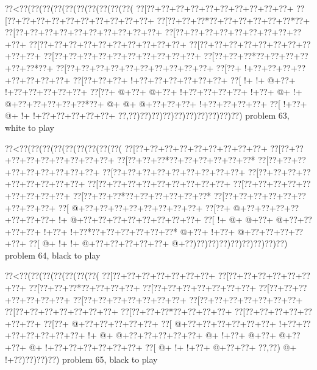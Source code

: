 \vbox{\vbox{\goo
\0??<\0??(\0??(\0??(\0??(\0??(\0??(\0??(\0??(\0??(\0??(
\0??[\0??+\0??+\0??+\0??+\0??+\0??+\0??+\0??+\0??+\0??+
\0??[\0??+\0??+\0??+\0??+\0??+\0??+\0??+\0??+\0??+\0??+
\0??[\0??+\0??+\0??*\0??+\0??+\0??+\0??+\0??+\0??*\0??+
\0??[\0??+\0??+\0??+\0??+\0??+\0??+\0??+\0??+\0??+\0??+
\0??[\0??+\0??+\0??+\0??+\0??+\0??+\0??+\0??+\0??+\0??+
\0??[\0??+\0??+\0??+\0??+\0??+\0??+\0??+\0??+\0??+\0??+
\0??[\0??+\0??+\0??+\0??+\0??+\0??+\0??+\0??+\0??+\0??+
\0??[\0??+\0??+\0??+\0??+\0??+\0??+\0??+\0??+\0??+\0??+
\0??[\0??+\0??+\0??*\0??+\0??+\0??+\0??+\0??+\0??*\0??+
\0??[\0??+\0??+\0??+\0??+\0??+\0??+\0??+\0??+\0??+\0??+
\0??[\0??+\- !+\0??+\0??+\0??+\0??+\0??+\0??+\0??+\0??+
\0??[\0??+\0??+\0??+\- !+\0??+\0??+\0??+\0??+\0??+\0??+
\0??[\- !+\- !+\- @+\0??+\- !+\0??+\0??+\0??+\0??+\0??+
\0??[\0??+\- @+\0??+\- @+\0??+\- !+\0??+\0??+\0??+\0??+
\- !+\0??+\- @+\- !+\- @+\0??+\0??+\0??+\0??+\0??*\0??+
\- @+\- @+\- @+\0??+\0??+\0??+\- !+\0??+\0??+\0??+\0??+
\0??[\- !+\0??+\- @+\- !+\- !+\0??+\0??+\0??+\0??+\0??+
\0??,\0??)\0??)\0??)\0??)\0??)\0??)\0??)\0??)\0??)\0??)
}
\hfil problem 63, white to play\hfil\break
}

\vbox{\vbox{\goo
\0??<\0??(\0??(\0??(\0??(\0??(\0??(\0??(\0??(\0??(
\0??[\0??+\0??+\0??+\0??+\0??+\0??+\0??+\0??+\0??+
\0??[\0??+\0??+\0??+\0??+\0??+\0??+\0??+\0??+\0??+
\0??[\0??+\0??+\0??*\0??+\0??+\0??+\0??+\0??+\0??*
\0??[\0??+\0??+\0??+\0??+\0??+\0??+\0??+\0??+\0??+
\0??[\0??+\0??+\0??+\0??+\0??+\0??+\0??+\0??+\0??+
\0??[\0??+\0??+\0??+\0??+\0??+\0??+\0??+\0??+\0??+
\0??[\0??+\0??+\0??+\0??+\0??+\0??+\0??+\0??+\0??+
\0??[\0??+\0??+\0??+\0??+\0??+\0??+\0??+\0??+\0??+
\0??[\0??+\0??+\0??*\0??+\0??+\0??+\0??+\0??+\0??*
\0??[\0??+\0??+\0??+\0??+\0??+\0??+\0??+\0??+\0??+
\0??[\- @+\0??+\0??+\0??+\0??+\0??+\0??+\0??+\0??+
\0??[\0??+\- @+\0??+\0??+\0??+\0??+\0??+\0??+\0??+
\- !+\- @+\0??+\0??+\0??+\0??+\0??+\0??+\0??+\0??+
\0??[\- !+\- @+\- @+\0??+\- @+\0??+\0??+\0??+\0??+
\- !+\0??+\- !+\0??*\0??+\0??+\0??+\0??+\0??+\0??*
\- @+\0??+\- !+\0??+\- @+\0??+\0??+\0??+\0??+\0??+
\0??[\- @+\- !+\- !+\- @+\0??+\0??+\0??+\0??+\0??+
\- @+\0??)\0??)\0??)\0??)\0??)\0??)\0??)\0??)\0??)
}
\hfil problem 64, black to play\hfil\break
}

\vbox{\vbox{\goo
\0??<\0??(\0??(\0??(\0??(\0??(\0??(\0??(
\0??[\0??+\0??+\0??+\0??+\0??+\0??+\0??+
\0??[\0??+\0??+\0??+\0??+\0??+\0??+\0??+
\0??[\0??+\0??+\0??*\0??+\0??+\0??+\0??+
\0??[\0??+\0??+\0??+\0??+\0??+\0??+\0??+
\0??[\0??+\0??+\0??+\0??+\0??+\0??+\0??+
\0??[\0??+\0??+\0??+\0??+\0??+\0??+\0??+
\0??[\0??+\0??+\0??+\0??+\0??+\0??+\0??+
\0??[\0??+\0??+\0??+\0??+\0??+\0??+\0??+
\0??[\0??+\0??+\0??*\0??+\0??+\0??+\0??+
\0??[\0??+\0??+\0??+\0??+\0??+\0??+\0??+
\0??[\0??+\- @+\0??+\0??+\0??+\0??+\0??+
\0??[\- @+\0??+\0??+\0??+\0??+\0??+\0??+
\- !+\0??+\0??+\0??+\0??+\0??+\0??+\0??+
\- !+\- @+\- @+\0??+\0??+\0??+\0??+\0??+
\- @+\- !+\0??+\- @+\0??+\- @+\0??+\0??+
\- @+\- !+\0??+\0??+\0??+\0??+\0??+\0??+
\0??[\- @+\- !+\- !+\0??+\- @+\0??+\0??+
\0??,\0??)\- @+\- !+\0??)\0??)\0??)\0??)
}
\hfil problem 65, black to play\hfil\break
}

